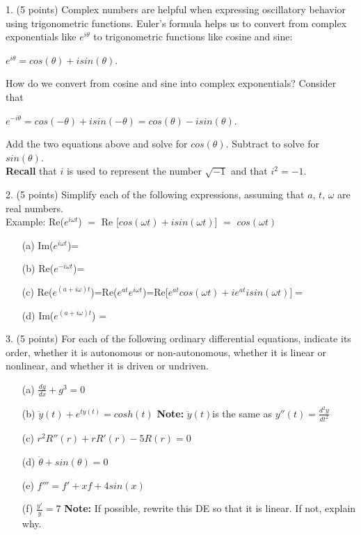 \documentclass[12pt,letterpaper]{hmcpset}
\begin{document}
\begin{problem}
1. (5 points) Complex numbers are helpful when expressing oscillatory behavior using trigonometric
functions. Euler’s formula helps us to convert from complex exponentials like $e^{i\theta}$ to
trigonometric functions like cosine and sine:
\begin{center}
$e^{i\theta} = cos(\theta) + isin(\theta)$.    
\end{center}
How do we convert from cosine and sine into complex exponentials? Consider that
\begin{center}
$e^{-i\theta} = cos(-\theta) + isin(-\theta)=cos(\theta) - isin(\theta)$.    
\end{center}
Add the two equations above and solve for $cos(\theta)$. Subtract to solve for $sin(\theta)$.\\
\textbf{Recall} that $i$ is used to represent the number $\sqrt{-1}$ and that $i^2 = -1$.
\end{problem}
\newpage

\begin{problem}
2. (5 points) Simplify each of the following expressions, assuming that $a$, $t$, $\omega$ are real numbers.\\
Example:  Re($e^{i\omega t}$) $=$ Re [$cos(\omega t) + isin(\omega t)$] $=$ $cos(\omega t)$

\begin{enumerate}
    \item[(a)] Im($e^{i\omega t}$)= 
    \item[(b)] Re($e^{-i\omega t}$)= 
    \item[(c)] Re($e^{(a+i\omega) t}$)=Re($e^{at}e^{i\omega t}$)=Re[$e^{at}cos(\omega t) + ie^{at}isin(\omega t)$]$=$ 
    \item[(d)] Im($e^{(a+i\omega) t}$) =
\end{enumerate}

\end{problem}
\newpage

\begin{problem}
3. (5 points) For each of the following ordinary differential equations, indicate its order, whether
it is autonomous or non-autonomous, whether it is linear or nonlinear, and whether it is
driven or undriven.\\

\begin{enumerate}
    \item[(a)] $ \frac{dg}{dx}+g^3=0$
    \item[(b)] $\ddot{y}(t)+e^{ty(t)}=cosh(t)$ \textbf{Note:} $\ddot{y}(t)$is the same as $y''(t)= \frac{d^2 y}{dt^2}$ 
    \item[(c)] $r^2R''(r) + rR'(r)-5R(r) =0$
    \item[(d)] $\ddot{\theta}+sin(\theta)=0$
    \item[(e)] $f'''=f'+xf+4sin(x)$
    \item[(f)] $\frac{y'}{y}=7$ \textbf{Note:} If possible, rewrite this DE so that it is linear. If not, explain why.
\end{enumerate}

\end{problem}
\newpage
\end{document}
